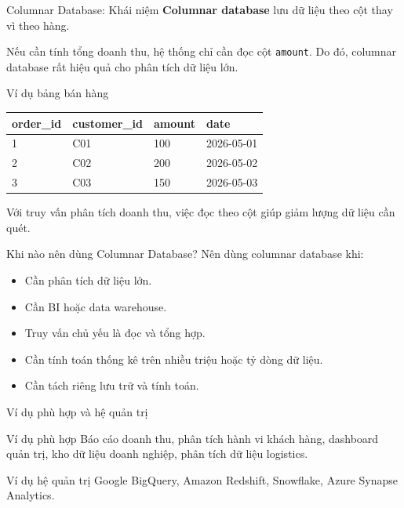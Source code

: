 \documentclass[aspectratio=169,11pt]{beamer}
\newcommand{\keyword}[1]{\textcolor{accent}{\textbf{#1}}}
\newcommand{\kw}[1]{\keyword{#1}}
\newcommand{\smallitem}{\setlength{\itemsep}{2pt}\setlength{\parskip}{0pt}}
\begin{document}
\begin{frame}{Columnar Database: Khái niệm}
\kw{Columnar database} lưu dữ liệu theo cột thay vì theo hàng.

\vspace{2mm}
Nếu cần tính tổng doanh thu, hệ thống chỉ cần đọc cột \texttt{amount}. Do đó, columnar database rất hiệu quả cho phân tích dữ liệu lớn.
\end{frame}

\begin{frame}{Ví dụ bảng bán hàng}
\scriptsize
\begin{center}
\begin{tabular}{llll}
\toprule
\textbf{order\_id} & \textbf{customer\_id} & \textbf{amount} & \textbf{date} \\
\midrule
1 & C01 & 100 & 2026-05-01 \\
2 & C02 & 200 & 2026-05-02 \\
3 & C03 & 150 & 2026-05-03 \\
\bottomrule
\end{tabular}
\end{center}

\vspace{2mm}
Với truy vấn phân tích doanh thu, việc đọc theo cột giúp giảm lượng dữ liệu cần quét.
\end{frame}

\begin{frame}{Khi nào nên dùng Columnar Database?}
Nên dùng columnar database khi:
\begin{itemize}
  \smallitem
  \item Cần phân tích dữ liệu lớn.
  \item Cần BI hoặc data warehouse.
  \item Truy vấn chủ yếu là đọc và tổng hợp.
  \item Cần tính toán thống kê trên nhiều triệu hoặc tỷ dòng dữ liệu.
  \item Cần tách riêng lưu trữ và tính toán.
\end{itemize}
\end{frame}

\begin{frame}{Ví dụ phù hợp và hệ quản trị}
\begin{block}{Ví dụ phù hợp}
Báo cáo doanh thu, phân tích hành vi khách hàng, dashboard quản trị, kho dữ liệu doanh nghiệp, phân tích dữ liệu logistics.
\end{block}

\begin{block}{Ví dụ hệ quản trị}
Google BigQuery, Amazon Redshift, Snowflake, Azure Synapse Analytics.
\end{block}
\end{frame}
\end{document}
